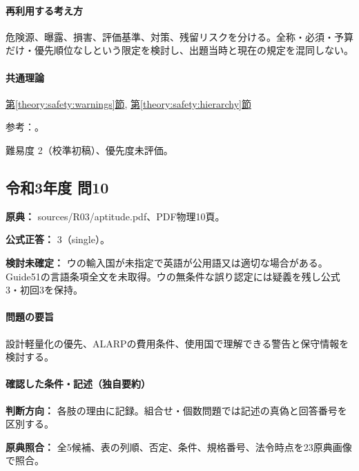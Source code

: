 \paragraph{再利用する考え方} 危険源、曝露、損害、評価基準、対策、残留リスクを分ける。全称・必須・予算だけ・優先順位なしという限定を検討し、出題当時と現在の規定を混同しない。

\paragraph{共通理論} \hyperref[theory:safety:warnings]{第\ref*{theory:safety:warnings}節}, \hyperref[theory:safety:hierarchy]{第\ref*{theory:safety:hierarchy}節}

\par 参考：\cite{saf_aeha,saf_guide51}。

\par 難易度 2（校準初稿）、優先度未評価。

\subsection{令和3年度 問10}
\label{q:r03-reg-apt-10}

\noindent\textbf{原典：} sources/R03/aptitude.pdf、PDF物理10頁。

\textbf{公式正答：} 3（single）。

\par\textbf{検討未確定：} ウの輸入国が未指定で英語が公用語又は適切な場合がある。Guide51の言語条項全文を未取得。ウの無条件な誤り認定には疑義を残し公式3・初回3を保持。

\paragraph{問題の要旨} 設計軽量化の優先、ALARPの費用条件、使用国で理解できる警告と保守情報を検討する。

\paragraph{確認した条件・記述（独自要約）}\mbox{}\par

\noindent\textbf{判断方向：} 各肢の理由に記録。組合せ・個数問題では記述の真偽と回答番号を区別する。\par

\noindent\textbf{原典照合：} 全5候補、表の列順、否定、条件、規格番号、法令時点を23原典画像で照合。\par

